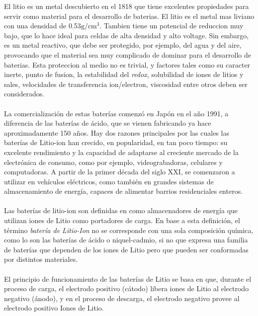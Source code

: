 \documentclass[10pt,a4paper]{article}
\begin{document}
    \noindent El litio es un metal descubierto en el 1818 que tiene excelentes 
    propiedades para servir como material para el desarrollo de baterias. 
    El litio es el metal mas liviano con una densidad de 0.53$\mathrm{g/cm^3}$. 
    Tambien tiene un potencial de reduccion muy bajo, que lo hace ideal para 
    celdas de alta densidad y alto voltage. Sin embargo, es un metal 
    reactivo, que debe ser protegido, por ejemplo, del agua y del aire, 
    provocando que el material sea muy complicado de dominar para el desarrollo 
    de baterias. Esta proteccion al medio no es trivial, y factores tales como 
    su caracter inerte, punto de fusion, la estabilidad del \emph{redox}, 
    solubilidad de iones de litios y sales, velocidades de transferencia 
    ion/electron, viscosidad entre otros deben ser considerados.\\
    \\
    La comercialización de estas baterías comenzó en Japón en el año 1991, 
    a diferencia de las baterías de ácido, que se vienen fabricando 
    ya hace aproximadamente 150 años. Hay dos razones principales por las 
    cuales las baterías de Litio-ion han crecido, en popularidad, en tan poco 
    tiempo: su excelente rendimiento y la capacidad de adaptarse al creciente 
    mercado de la electrónica de consumo, como por ejemplo, videograbadoras, 
    celulares y computadoras. A partir de la primer década del siglo XXI, se 
    comenzaron a utilizar en vehículos eléctricos, como también en grandes 
    sistemas de almacenamiento de energía, capaces de alimentar barrios 
    residenciales enteros.\\
	\\
	\noindent Las baterías de litio-ion son definidas en \cite{def_liion} como 
    almacenadores de energía que utilizan iones de Litio como portadores de 
    carga. En base a esta definición, el término \emph{batería de Litio-Ion} no 
    se corresponde con una sola composición química, como lo son las baterías 
    de ácido o niquel-cadmio, si no que expresa una familia de baterías que 
    dependen de los iones de Litio pero que pueden ser conformadas por 
    distintos materiales.\\
    \\
	\noindent El principio de funcionamiento de las baterías de Litio se basa 
    en que, durante el proceso de carga, el electrodo positivo (cátodo) libera 
    iones de Litio al electrodo negativo (ánodo), y  en el proceso de descarga, 
    el electrodo negativo provee al electrodo positivo Iones de Litio. 
\end{document}

